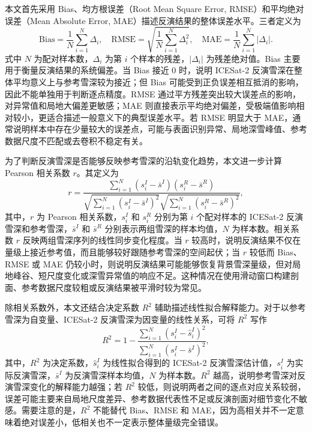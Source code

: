 本文首先采用 Bias、均方根误差（Root Mean Square Error, RMSE）和平均绝对误差（Mean Absolute Error, MAE）描述反演结果的整体误差水平。三者定义为
\begin{equation}
    \mathrm{Bias}
    =
    \frac{1}{N}
    \sum_{i=1}^{N}
    \Delta_i,
    \quad
    \mathrm{RMSE}
    =
    \sqrt{
    \frac{1}{N}
    \sum_{i=1}^{N}
    \Delta_i^2
    },
    \quad
    \mathrm{MAE}
    =
    \frac{1}{N}
    \sum_{i=1}^{N}
    \left|\Delta_i\right|.
\end{equation}
式中 \(N\) 为配对样本数，\(\Delta_i\) 为第 \(i\) 个样本的残差，\(|\Delta_i|\) 为残差绝对值。Bias 主要用于衡量反演结果的系统偏差。当 Bias 接近 0 时，说明 ICESat-2 反演雪深在整体平均意义上与参考雪深较为接近；但 Bias 可能受到正负误差相互抵消的影响，因此不能单独用于判断逐点精度。RMSE 通过平方残差突出较大误差点的影响，对异常值和局地大偏差更敏感；MAE 则直接表示平均绝对偏差，受极端值影响相对较小，更适合描述一般意义下的典型误差水平。若 RMSE 明显大于 MAE，通常说明样本中存在少量较大的误差点，可能与表面识别异常、局地深雪峰值、参考数据尺度不匹配或去卷积不稳定有关。

为了判断反演雪深是否能够反映参考雪深的沿轨变化趋势，本文进一步计算 Pearson 相关系数 \(r\)。其定义为
\begin{equation}
    r =
    \frac{
    \sum_{i=1}^{N}
    \left(s_i^{I}-\bar{s}^{I}\right)
    \left(s_i^{R}-\bar{s}^{R}\right)
    }
    {
    \sqrt{
    \sum_{i=1}^{N}
    \left(s_i^{I}-\bar{s}^{I}\right)^2
    }
    \sqrt{
    \sum_{i=1}^{N}
    \left(s_i^{R}-\bar{s}^{R}\right)^2
    }
    },
\end{equation}
其中，\(r\) 为 Pearson 相关系数，\(s_i^{I}\) 和 \(s_i^{R}\) 分别为第 \(i\) 个配对样本的 ICESat-2 反演雪深和参考雪深，\(\bar{s}^{I}\) 和 \(\bar{s}^{R}\) 分别表示两组雪深的样本均值，\(N\) 为样本数。相关系数 \(r\) 反映两组雪深序列的线性同步变化程度。当 \(r\) 较高时，说明反演结果不仅在量级上接近参考值，而且能够较好跟随参考雪深的空间起伏；当 \(r\) 较低而 Bias、RMSE 或 MAE 仍较小时，则说明反演结果可能能够恢复背景雪深量级，但对局地峰谷、短尺度变化或深雪异常值的响应不足。这种情况在使用滑动窗口构建剖面、参考数据尺度较粗或反演结果被平滑时较为常见。

除相关系数外，本文还结合决定系数 \(R^2\) 辅助描述线性拟合解释能力。对于以参考雪深为自变量、ICESat-2 反演雪深为因变量的线性关系，可将 \(R^2\) 写作
\begin{equation}
    R^2
    =
    1 -
    \frac{
    \sum_{i=1}^{N}
    \left(s_i^{I}-\hat{s}_i^{I}\right)^2
    }
    {
    \sum_{i=1}^{N}
    \left(s_i^{I}-\bar{s}^{I}\right)^2
    },
\end{equation}
其中，\(R^2\) 为决定系数，\(\hat{s}_i^{I}\) 为线性拟合得到的 ICESat-2 反演雪深估计值，\(s_i^{I}\) 为实际反演雪深，\(\bar{s}^{I}\) 为反演雪深样本均值，\(N\) 为样本数。\(R^2\) 越高，说明参考雪深对反演雪深变化的解释能力越强；若 \(R^2\) 较低，则说明两者之间的逐点对应关系较弱，误差可能主要来自局地尺度差异、参考数据代表性不足或反演剖面对细节变化不敏感。需要注意的是，\(R^2\) 不能替代 Bias、RMSE 和 MAE，因为高相关并不一定意味着绝对误差小，低相关也不一定表示整体量级完全错误。

